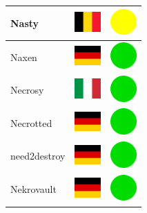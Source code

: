 \documentclass[12pt, a4paper, twoside]{report}
\begin{document}
\begin{center}
\begin{longtable}{|p{5cm}|p{2cm}|p{2cm}|}
 Nasty                                                      & \includegraphics[width=1cm]{4x3/be} &   \includegraphics[width=1cm]{likes/m} \\ \hline
 Naxen                                                      & \includegraphics[width=1cm]{4x3/de} &   \includegraphics[width=1cm]{likes/y} \\ \hline
 Necrosy                                                    & \includegraphics[width=1cm]{4x3/it} &   \includegraphics[width=1cm]{likes/y} \\ \hline
 Necrotted                                                  & \includegraphics[width=1cm]{4x3/de} &   \includegraphics[width=1cm]{likes/y} \\ \hline
 need2destroy                                               & \includegraphics[width=1cm]{4x3/de} &   \includegraphics[width=1cm]{likes/y} \\ \hline
 Nekrovault                                                 & \includegraphics[width=1cm]{4x3/de} &   \includegraphics[width=1cm]{likes/y} \\ \hline

\end{longtable}
\end{center}
\end{document}
